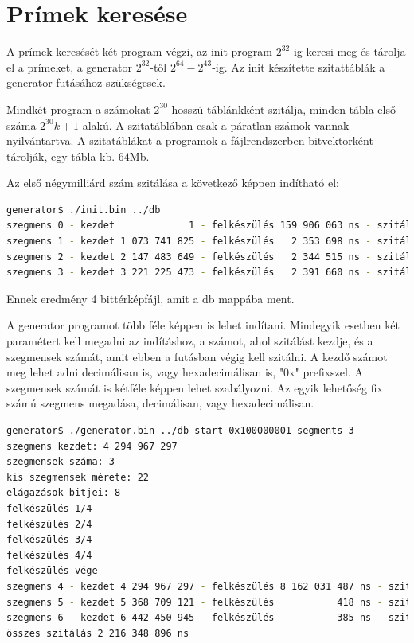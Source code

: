 \section{Prímek keresése}

A prímek keresését két program végzi, az init program
$2^{32}$-ig keresi meg és tárolja el a prímeket,
a generator $2^{32}$-től $2^{64}-2^{43}$-ig.
Az init készítette szitattáblák a generator futásához szükségesek.

Mindkét program a számokat $2^{30}$ hosszú táblánkként szitálja,
minden tábla első száma $2^{30}k+1$ alakú.
A szitatáblában csak a páratlan számok vannak nyilvántartva.
A szitatáblákat a programok a
fájlrendszerben bitvektorként tárolják, egy tábla kb. $64$Mb.

Az első négymilliárd szám szitálása a következő képpen indítható el:

\begin{lstlisting}[language=bash]
generator$ ./init.bin ../db
szegmens 0 - kezdet             1 - felkészülés 159 906 063 ns - szitálás 1 122 878 403 ns
szegmens 1 - kezdet 1 073 741 825 - felkészülés   2 353 698 ns - szitálás 1 171 101 336 ns
szegmens 2 - kezdet 2 147 483 649 - felkészülés   2 344 515 ns - szitálás 1 188 330 478 ns
szegmens 3 - kezdet 3 221 225 473 - felkészülés   2 391 660 ns - szitálás 1 199 900 603 ns
\end{lstlisting}
Ennek eredmény 4 bittérképfájl, amit a db mappába ment.

A generator programot több féle képpen is lehet indítani.
Mindegyik esetben két paramétert kell megadni az indításhoz,
a számot, ahol szitálást kezdje, és a szegmensek számát, amit
ebben a futásban végig kell szitálni.
A kezdő számot meg lehet adni decimálisan is, vagy hexadecimálisan is,
"0x" prefixszel. A szegmensek számát is kétféle képpen lehet szabályozni.
Az egyik lehetőség fix számú szegmens megadása, decimálisan, vagy hexadecimálisan.

\begin{lstlisting}[language=bash]
generator$ ./generator.bin ../db start 0x100000001 segments 3
szegmens kezdet: 4 294 967 297
szegmensek száma: 3
kis szegmensek mérete: 22
elágazások bitjei: 8
felkészülés 1/4
felkészülés 2/4
felkészülés 3/4
felkészülés 4/4
felkészülés vége
szegmens 4 - kezdet 4 294 967 297 - felkészülés 8 162 031 487 ns - szitálás 729 914 370 ns
szegmens 5 - kezdet 5 368 709 121 - felkészülés           418 ns - szitálás 736 412 117 ns
szegmens 6 - kezdet 6 442 450 945 - felkészülés           385 ns - szitálás 750 022 409 ns
összes szitálás 2 216 348 896 ns
\end{lstlisting}

